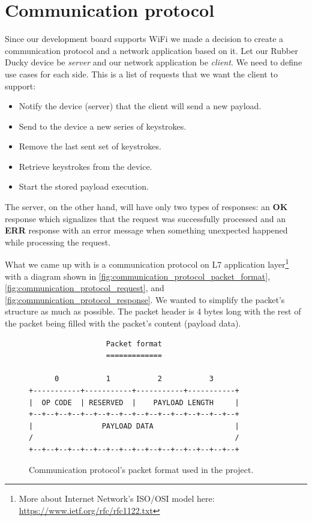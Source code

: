 \section{Communication protocol}
\label{communicationProtocol}
Since our development board supports WiFi we made a decision to create a communication protocol and a network application based on it. Let our Rubber Ducky device be \emph{server} and our network application be \emph{client}. We need to define use cases for each side. This is a list of requests that we want the client to support:
\begin{itemize}
    \item Notify the device (server) that the client will send a new payload.
    \item Send to the device a new series of keystrokes.
    \item Remove the last sent set of keystrokes.
    \item Retrieve keystrokes from the device.
    \item Start the stored payload execution.
\end{itemize}

The server, on the other hand, will have only two types of responses: an \textbf{OK} response which signalizes that the request was successfully processed and an \textbf{ERR} response with an error message when something unexpected happened while processing the request.

What we came up with is a communication protocol on L7 application layer\footnote{More about Internet Network's ISO/OSI model here: \url{https://www.ietf.org/rfc/rfc1122.txt}} with a diagram shown in \autoref{fig:communication_protocol_packet_format}, \autoref{fig:communication_protocol_request}, and \autoref{fig:communication_protocol_response}. We wanted to simplify the packet's structure as much as possible. The packet header is 4 bytes long with the rest of the packet being filled with the packet's content (payload data).

\begin{figure}[ht]
\centering
\begin{varwidth}{\linewidth}
\begin{verbatim}
                  Packet format
                  =============

      0           1           2           3
+-----------+-----------+-----------+-----------+
|  OP CODE  | RESERVED  |    PAYLOAD LENGTH     |
+--+--+--+--+--+--+--+--+--+--+--+--+--+--+--+--+
|                PAYLOAD DATA                   |
/                                               /
+--+--+--+--+--+--+--+--+--+--+--+--+--+--+--+--+
\end{verbatim}
\end{varwidth}
\caption{Communication protocol's packet format used in the project.}
\label{fig:communication_protocol_packet_format}
\end{figure}

